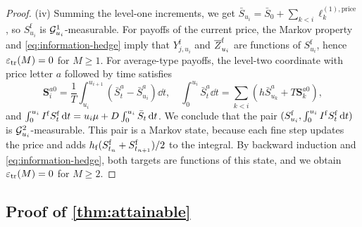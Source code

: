 \begin{proof}
(iv) Summing the level-one increments, we get $\bar S_{u_i}=\bar S_0+\sum_{k<i}\ell_k^{(1),\mathrm{price}}$, so $S^{\mathrm f}_{u_i}$ is $\mathcal{G}^1_{u_i}$-measurable. For payoffs of the current price, the Markov property and \eqref{eq:information-hedge} imply that $Y^{\mathrm f}_{j,u_i}$ and $\overline Z^{\mathrm f}_{u_i}$ are functions of $S^{\mathrm f}_{u_i}$, hence $\varepsilon_{\mathrm{tr}}(M)=0$ for $M\ge1$. For average-type payoffs, the level-two coordinate with price letter $a$ followed by time satisfies
\[
\mathbf S_i^{a0}=\frac1T\int_{u_i}^{u_{i+1}}(\bar S^a_t-\bar S^a_{u_i})\dd t,\quad
\int_0^{u_i}\bar S^a_t\dd t=\sum_{k<i}\left(h\bar S^a_{u_k}+T\mathbf S_k^{a0}\right),
\]
and $\int_0^{u_i}I^{\mathrm f} S^{\mathrm f}_t\,\mathrm{d} t=u_i\mu+D\int_0^{u_i}\bar S_t\,\mathrm{d} t$. We conclude that the pair $(S^{\mathrm f}_{u_i},\int_0^{u_i}I^{\mathrm f} S^{\mathrm f}_t\,\mathrm{d} t)$ is $\mathcal{G}^2_{u_i}$-measurable. This pair is a Markov state, because each fine step updates the price and adds $h_{\mathrm f}(S^{\mathrm f}_{t_n}+S^{\mathrm f}_{t_{n+1}})/2$ to the integral. By backward induction and \eqref{eq:information-hedge}, both targets are functions of this state, and we obtain $\varepsilon_{\mathrm{tr}}(M)=0$ for $M\ge2$.
\end{proof}

\subsection{Proof of \texorpdfstring{\cref{thm:attainable}}{Theorem 7}}\label{app:attainable}

